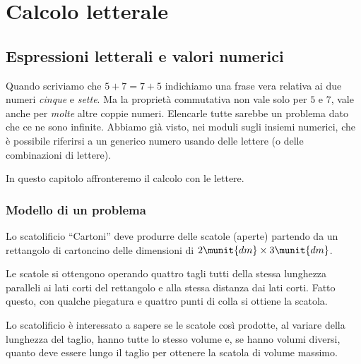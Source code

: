 


\chapter{Calcolo letterale}


\section{Espressioni letterali e valori numerici}
\label{sec:calclett_esplett}

Quando scriviamo che \(5 +7 = 7 +5\) indichiamo una frase vera relativa 
ai due numeri \emph{cinque} e \emph{sette}.
Ma la proprietà commutativa non vale solo per \(5\) e \(7\), vale anche 
per \emph{molte} altre coppie numeri.
Elencarle tutte sarebbe un problema dato che ce ne sono infinite.
Abbiamo già visto, nei moduli sugli insiemi numerici, che è possibile 
riferirsi a un generico numero usando delle lettere 
(o delle combinazioni di lettere).

In questo capitolo affronteremo il calcolo con le lettere.

\subsection{Modello di un problema}
\label{subsec:calclett_modello}

\begin{problema}{}{}\label{cartoni}
Lo scatolificio ``Cartoni'' deve produrre delle scatole (aperte) partendo 
da un rettangolo di cartoncino delle dimensioni di 
\(2\munit{dm} \times 3\munit{dm}\).

Le scatole si ottengono operando quattro tagli tutti della stessa 
lunghezza paralleli ai lati corti del rettangolo e alla stessa distanza 
dai lati corti. 
Fatto questo, con qualche piegatura e quattro punti di colla si ottiene 
la scatola.

Lo scatolificio è interessato a sapere se le scatole così prodotte,
al variare della lunghezza del taglio, hanno tutte lo stesso volume e, 
se hanno volumi diversi, quanto deve essere lungo 
il taglio per ottenere la scatola di volume massimo. \\[.5em]
\scatola 
\end{problema}

